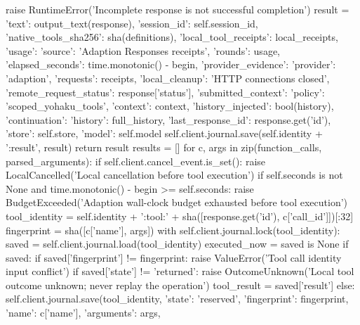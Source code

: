 {                    raise RuntimeError('Incomplete response is not successful completion')
                result = {'text': output_text(response), 'session_id': self.session_id,
                          'native_tools_sha256': sha(definitions),
                          'local_tool_receipts': local_receipts,
                          'usage': {'source': 'Adaption Responses receipts', 'rounds': usage},
                          'elapsed_seconds': time.monotonic() - begin,
                          'provider_evidence': {'provider': 'adaption', 'requests': receipts,
                                                'local_cleanup': 'HTTP connections closed',
                                                'remote_request_status': response['status']},
                          'submitted_context': {'policy': 'scoped_yohaku_tools', 'context': context,
                                                'history_injected': bool(history)},
                          'continuation': {'history': full_history, 'last_response_id': response.get('id'),
                                           'store': self.store, 'model': self.model}}
                self.client.journal.save(self.identity + ':result', result)
                return result
            results = []
            for c, args in zip(function_calls, parsed_arguments):
                if self.client.cancel_event.is_set():
                    raise LocalCancelled('Local cancellation before tool execution')
                if self.seconds is not None and time.monotonic() - begin >= self.seconds:
                    raise BudgetExceeded('Adaption wall-clock budget exhausted before tool execution')
                tool_identity = self.identity + ':tool:' + sha([response.get('id'), c['call_id']])[:32]
                fingerprint = sha([c['name'], args])
                with self.client.journal.lock(tool_identity):
                    saved = self.client.journal.load(tool_identity)
                    executed_now = saved is None
                    if saved:
                        if saved['fingerprint'] != fingerprint:
                            raise ValueError('Tool call identity input conflict')
                        if saved['state'] != 'returned':
                            raise OutcomeUnknown('Local tool outcome unknown; never replay the operation')
                        tool_result = saved['result']
                    else:
                        self.client.journal.save(tool_identity, {'state': 'reserved', 'fingerprint': fingerprint,
                                                                 'name': c['name'], 'arguments': args,
}}
